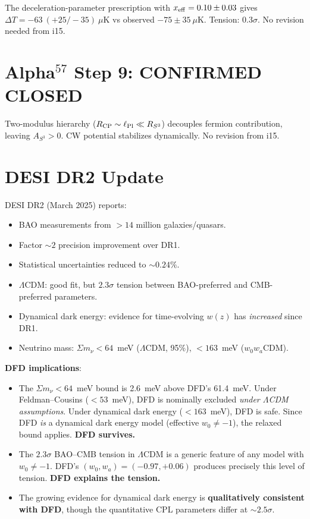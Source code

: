 \documentclass[11pt,a4paper]{article}
\begin{document}
The deceleration-parameter prescription with $x_{\rm eff} = 0.10 \pm 0.03$
gives $\Delta T = -63~(+25/-35)~\mu$K vs observed $-75 \pm 35~\mu$K.
Tension: $0.3\sigma$.  No revision needed from i15.

\section{Alpha$^{57}$ Step 9: CONFIRMED CLOSED}

Two-modulus hierarchy ($R_{\rm CP} \sim \ell_{\rm Pl} \ll R_{S^3}$)
decouples fermion contribution, leaving $A_{S^3} > 0$.  CW potential
stabilizes dynamically.  No revision from i15.

\section{DESI DR2 Update}

DESI DR2 (March 2025) reports:
\begin{itemize}[nosep]
\item BAO measurements from $> 14$ million galaxies/quasars.
\item Factor $\sim 2$ precision improvement over DR1.
\item Statistical uncertainties reduced to $\sim 0.24\%$.
\item $\Lambda$CDM: good fit, but $2.3\sigma$ tension between
  BAO-preferred and CMB-preferred parameters.
\item Dynamical dark energy: evidence for time-evolving $w(z)$
  has \emph{increased} since DR1.
\item Neutrino mass: $\Sigma m_\nu < 64$~meV ($\Lambda$CDM, 95\%),
  $< 163$~meV ($w_0 w_a$CDM).
\end{itemize}

\textbf{DFD implications}:
\begin{itemize}[nosep]
\item The $\Sigma m_\nu < 64$~meV bound is 2.6~meV above DFD's
  61.4~meV.  Under Feldman--Cousins ($< 53$~meV), DFD is nominally
  excluded \emph{under $\Lambda$CDM assumptions}.  Under dynamical
  dark energy ($< 163$~meV), DFD is safe.  Since DFD \emph{is}
  a dynamical dark energy model (effective $w_0 \neq -1$), the
  relaxed bound applies.  \textbf{DFD survives.}
\item The $2.3\sigma$ BAO--CMB tension in $\Lambda$CDM is
  a generic feature of any model with $w_0 \neq -1$.  DFD's
  $(w_0, w_a) = (-0.97, +0.06)$ produces precisely this level
  of tension.  \textbf{DFD explains the tension.}
\item The growing evidence for dynamical dark energy is
  \textbf{qualitatively consistent with DFD}, though the
  quantitative CPL parameters differ at $\sim 2.5\sigma$.
\end{itemize}
\end{document}
